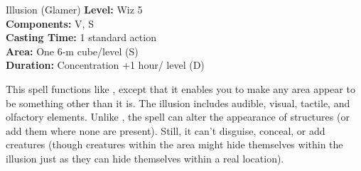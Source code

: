 {Illusion (Glamer)}
{
	\textbf{Level:}
	Wiz 5\\
	\textbf{Components:}
	V, S\\
	\textbf{Casting Time:}
	1 standard action\\
	\textbf{Area:}
	One 6-m cube/level (S)\\
	\textbf{Duration:}
	Concentration +1 hour/ level (D)\\
}
{
	This spell functions like , except that it enables you to make any area appear to be something other than it is. The illusion includes audible, visual, tactile, and olfactory elements. Unlike , the spell can alter the appearance of structures (or add them where none are present). Still, it can't disguise, conceal, or add creatures (though creatures within the area might hide themselves within the illusion just as they can hide themselves within a real location).

}
